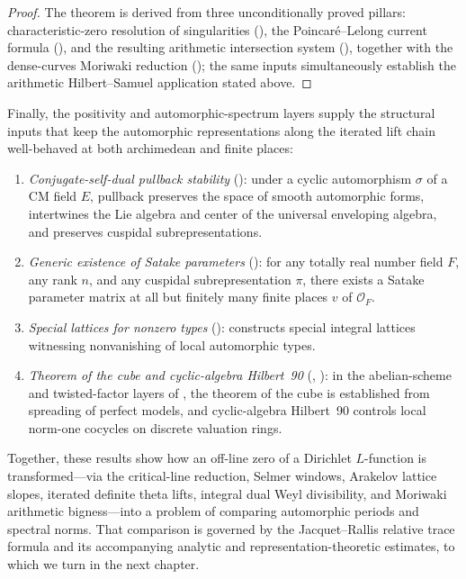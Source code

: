 \begin{proof}
The theorem
 is
derived from three unconditionally proved pillars: characteristic-zero
resolution of singularities (),
the Poincar\'e--Lelong current formula
(), and the resulting
arithmetic intersection system
(),
together with the dense-curves Moriwaki reduction
(); the same inputs
simultaneously establish the arithmetic Hilbert--Samuel application stated
above.
\end{proof}

Finally, the positivity and automorphic-spectrum layers supply the structural
inputs that keep the automorphic representations along the iterated lift chain
well-behaved at both archimedean and finite places:
\begin{enumerate}
  \item \emph{Conjugate-self-dual pullback stability}
        (): under a cyclic
        automorphism $\sigma$ of a CM field $E$, pullback preserves the space
        of smooth automorphic forms, intertwines the Lie algebra and center of
        the universal enveloping algebra, and preserves cuspidal
        subrepresentations.
  \item \emph{Generic existence of Satake parameters}
        (): for any
        totally real number field $F$, any rank $n$, and any cuspidal
        subrepresentation $\pi$, there exists a Satake parameter matrix at all
        but finitely many finite places $v$ of $\mathcal{O}_F$.
  \item \emph{Special lattices for nonzero types}
        (): constructs special integral
        lattices witnessing nonvanishing of local automorphic types.
  \item \emph{Theorem of the cube and cyclic-algebra Hilbert~90}
        (,
        ): in the
        abelian-scheme and twisted-factor layers of
        , the theorem of the cube is
        established from spreading of perfect models, and cyclic-algebra
        Hilbert~90 controls local norm-one cocycles on discrete valuation rings.
\end{enumerate}

Together, these results show how an off-line zero of a Dirichlet $L$-function
is transformed---via the critical-line reduction, Selmer windows, Arakelov
lattice slopes, iterated definite theta lifts, integral dual Weyl divisibility,
and Moriwaki arithmetic bigness---into a problem of comparing automorphic periods
and spectral norms.
That comparison is governed by the Jacquet--Rallis relative trace formula and
its accompanying analytic and representation-theoretic estimates, to which we
turn in the next chapter.
